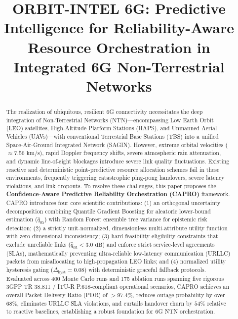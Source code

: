 \documentclass[conference]{IEEEtran}
\begin{document}
\title{ORBIT-INTEL 6G: Predictive Intelligence for Reliability-Aware Resource Orchestration in Integrated 6G Non-Terrestrial Networks}

\author{
}

\maketitle

\begin{abstract}
The realization of ubiquitous, resilient 6G connectivity necessitates the deep integration of Non-Terrestrial Networks (NTN)---encompassing Low Earth Orbit (LEO) satellites, High-Altitude Platform Stations (HAPS), and Unmanned Aerial Vehicles (UAVs)---with conventional Terrestrial Base Stations (TBS) into a unified Space-Air-Ground Integrated Network (SAGIN). However, extreme orbital velocities ($\approx 7.56\text{ km/s}$), rapid Doppler frequency shifts, severe atmospheric rain attenuation, and dynamic line-of-sight blockages introduce severe link quality fluctuations. Existing reactive and deterministic point-predictive resource allocation schemes fail in these environments, frequently triggering catastrophic ping-pong handovers, severe latency violations, and link dropouts. To resolve these challenges, this paper proposes the \textbf{Confidence-Aware Predictive Reliability Orchestration (CAPRO)} framework. CAPRO introduces four core scientific contributions: (1) an orthogonal uncertainty decomposition combining Quantile Gradient Boosting for aleatoric lower-bound estimation ($\hat{q}_{05}$) with Random Forest ensemble tree variance for epistemic risk detection; (2) a strictly unit-normalized, dimensionless multi-attribute utility function with zero dimensional inconsistency; (3) hard feasibility eligibility constraints that exclude unreliable links ($\hat{q}_{05} < 3.0\text{ dB}$) and enforce strict service-level agreements (SLAs), mathematically preventing ultra-reliable low-latency communication (URLLC) packets from misallocating to high-propagation LEO links; and (4) normalized utility hysteresis gating ($\Delta_{\text{hyst}} = 0.08$) with deterministic graceful fallback protocols. Evaluated across 400 Monte Carlo runs and 175 ablation runs spanning five rigorous 3GPP TR 38.811 / ITU-R P.618-compliant operational scenarios, CAPRO achieves an overall Packet Delivery Ratio (PDR) of $>97.4\%$, reduces outage probability by over $68\%$, eliminates URLLC SLA violations, and curtails handover churn by $54\%$ relative to reactive baselines, establishing a robust foundation for 6G NTN orchestration.
\end{abstract}
\end{document}

